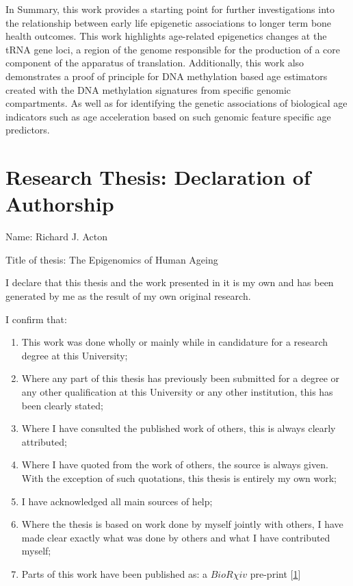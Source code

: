 \documentclass[
]{book}
\providecommand{\tightlist}{%
  \setlength{\itemsep}{0pt}\setlength{\parskip}{0pt}}
\begin{document}
In Summary, this work provides a starting point for further investigations into the relationship between early life epigenetic associations to longer term bone health outcomes.
This work highlights age-related epigenetics changes at the tRNA gene loci, a region of the genome responsible for the production of a core component of the apparatus of translation.
Additionally, this work also demonstrates a proof of principle for DNA methylation based age estimators created with the DNA methylation signatures from specific genomic compartments.
As well as for identifying the genetic associations of biological age indicators such as age acceleration based on such genomic feature specific age predictors.

{
\hypersetup{linkcolor=}
\setcounter{tocdepth}{4}
\tableofcontents
}
\newpage

\hypertarget{research-thesis-declaration-of-authorship}{%
\chapter*{Research Thesis: Declaration of Authorship}\label{research-thesis-declaration-of-authorship}}

Name: Richard J. Acton

Title of thesis: The Epigenomics of Human Ageing

I declare that this thesis and the work presented in it is my own and has been generated by me as the result of my own original research.

I confirm that:

\begin{enumerate}
\def\labelenumi{\arabic{enumi}.}
\tightlist
\item
  This work was done wholly or mainly while in candidature for a research degree at this University;
\item
  Where any part of this thesis has previously been submitted for a degree or any other qualification at this University or any other institution, this has been clearly stated;
\item
  Where I have consulted the published work of others, this is always clearly attributed;
\item
  Where I have quoted from the work of others, the source is always given. With the exception of such quotations, this thesis is entirely my own work;
\item
  I have acknowledged all main sources of help;
\item
  Where the thesis is based on work done by myself jointly with others, I have made clear exactly what was done by others and what I have contributed myself;
\item
  Parts of this work have been published as: a \(BioR \chi iv\) pre-print {[}\protect\hyperlink{ref-Acton2020}{1}{]}
\end{enumerate}
\end{document}
